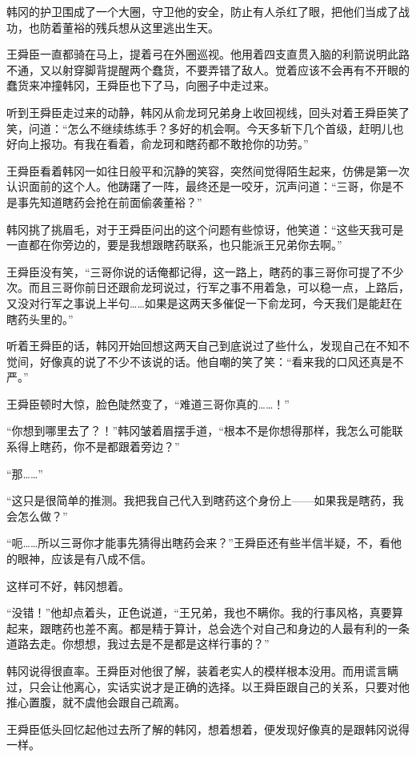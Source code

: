 韩冈的护卫围成了一个大圈，守卫他的安全，防止有人杀红了眼，把他们当成了战功，也防着董裕的残兵想从这里逃出生天。

王舜臣一直都骑在马上，提着弓在外圈巡视。他用着四支直贯入脑的利箭说明此路不通，又以射穿脚背提醒两个蠢货，不要弄错了敌人。觉着应该不会再有不开眼的蠢货来冲撞韩冈，王舜臣也下了马，向圈子中走过来。

听到王舜臣走过来的动静，韩冈从俞龙珂兄弟身上收回视线，回头对着王舜臣笑了笑，问道：“怎么不继续练练手？多好的机会啊。今天多斩下几个首级，赶明儿也好向上报功。有我在看着，俞龙珂和瞎药都不敢抢你的功劳。”

王舜臣看着韩冈一如往日般平和沉静的笑容，突然间觉得陌生起来，仿佛是第一次认识面前的这个人。他踌躇了一阵，最终还是一咬牙，沉声问道：“三哥，你是不是事先知道瞎药会抢在前面偷袭董裕？”

韩冈挑了挑眉毛，对于王舜臣问出的这个问题有些惊讶，他笑道：“这些天我可是一直都在你旁边的，要是我想跟瞎药联系，也只能派王兄弟你去啊。”

王舜臣没有笑，“三哥你说的话俺都记得，这一路上，瞎药的事三哥你可提了不少次。而且三哥你前日还跟俞龙珂说过，行军之事不用着急，可以稳一点，上路后，又没对行军之事说上半句……如果是这两天多催促一下俞龙珂，今天我们是能赶在瞎药头里的。”

听着王舜臣的话，韩冈开始回想这两天自己到底说过了些什么，发现自己在不知不觉间，好像真的说了不少不该说的话。他自嘲的笑了笑：“看来我的口风还真是不严。”

王舜臣顿时大惊，脸色陡然变了，“难道三哥你真的……！”

“你想到哪里去了？！”韩冈皱着眉摆手道，“根本不是你想得那样，我怎么可能联系得上瞎药，你不是都跟着旁边？”

“那……”

“这只是很简单的推测。我把我自己代入到瞎药这个身份上——如果我是瞎药，我会怎么做？”

“呃……所以三哥你才能事先猜得出瞎药会来？”王舜臣还有些半信半疑，不，看他的眼神，应该是有八成不信。

这样可不好，韩冈想着。

“没错！”他却点着头，正色说道，“王兄弟，我也不瞒你。我的行事风格，真要算起来，跟瞎药也差不离。都是精于算计，总会选个对自己和身边的人最有利的一条道路去走。你想想，我过去是不是都是这样行事的？”

韩冈说得很直率。王舜臣对他很了解，装着老实人的模样根本没用。而用谎言瞒过，只会让他离心，实话实说才是正确的选择。以王舜臣跟自己的关系，只要对他推心置腹，就不虞他会跟自己疏离。

王舜臣低头回忆起他过去所了解的韩冈，想着想着，便发现好像真的是跟韩冈说得一样。


